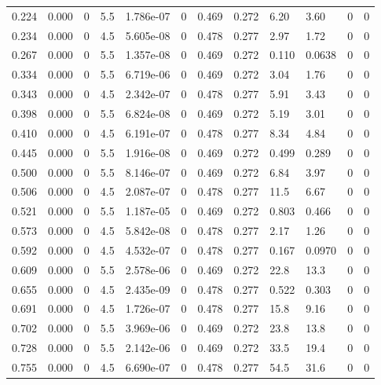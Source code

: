 \documentclass[preview]{standalone}
\begin{document}
{{\begin{tabular}{L{1.2cm}C{1.2cm} C{0.3cm}C{0.5cm} C{1.4cm}C{1.4cm} C{1.4cm}C{1.4cm} C{1.6cm}C{1.6cm} C{1.6cm}C{1.6cm}}
  0.224  &  0.000  & 0     & 5.5 &  1.786e-07  & 0  &  0.469&   0.272& 6.20 & 3.60   &  0 & 0  \\ 
  0.234  &  0.000  & 0     & 4.5 &  5.605e-08  & 0  &  0.478&   0.277& 2.97 & 1.72   &  0 & 0  \\ 
  0.267  &  0.000  & 0     & 5.5 &  1.357e-08  & 0  &  0.469&   0.272& 0.110 & 0.0638   &  0 & 0  \\ 
  0.334  &  0.000  & 0     & 5.5 &  6.719e-06  & 0  &  0.469&   0.272& 3.04 & 1.76   &  0 & 0  \\ 
  0.343  &  0.000  & 0     & 4.5 &  2.342e-07  & 0  &  0.478&   0.277& 5.91 & 3.43   &  0 & 0  \\ 
  0.398  &  0.000  & 0     & 5.5 &  6.824e-08  & 0  &  0.469&   0.272& 5.19 & 3.01   &  0 & 0  \\ 
  0.410  &  0.000  & 0     & 4.5 &  6.191e-07  & 0  &  0.478&   0.277& 8.34 & 4.84   &  0 & 0  \\ 
  0.445  &  0.000  & 0     & 5.5 &  1.916e-08  & 0  &  0.469&   0.272& 0.499 & 0.289   &  0 & 0  \\ 
  0.500  &  0.000  & 0     & 5.5 &  8.146e-07  & 0  &  0.469&   0.272& 6.84 & 3.97   &  0 & 0  \\ 
  0.506  &  0.000  & 0     & 4.5 &  2.087e-07  & 0  &  0.478&   0.277& 11.5 & 6.67   &  0 & 0  \\ 
  0.521  &  0.000  & 0     & 5.5 &  1.187e-05  & 0  &  0.469&   0.272& 0.803 & 0.466   &  0 & 0  \\ 
  0.573  &  0.000  & 0     & 4.5 &  5.842e-08  & 0  &  0.478&   0.277& 2.17 & 1.26   &  0 & 0  \\ 
  0.592  &  0.000  & 0     & 4.5 &  4.532e-07  & 0  &  0.478&   0.277& 0.167 & 0.0970   &  0 & 0  \\ 
  0.609  &  0.000  & 0     & 5.5 &  2.578e-06  & 0  &  0.469&   0.272& 22.8 & 13.3   &  0 & 0  \\ 
  0.655  &  0.000  & 0     & 4.5 &  2.435e-09  & 0  &  0.478&   0.277& 0.522 & 0.303   &  0 & 0  \\ 
  0.691  &  0.000  & 0     & 4.5 &  1.726e-07  & 0  &  0.478&   0.277& 15.8 & 9.16   &  0 & 0  \\ 
  0.702  &  0.000  & 0     & 5.5 &  3.969e-06  & 0  &  0.469&   0.272& 23.8 & 13.8   &  0 & 0  \\ 
  0.728  &  0.000  & 0     & 5.5 &  2.142e-06  & 0  &  0.469&   0.272& 33.5 & 19.4   &  0 & 0  \\ 
  0.755  &  0.000  & 0     & 4.5 &  6.690e-07  & 0  &  0.478&   0.277& 54.5 & 31.6   &  0 & 0  \\ 

\end{tabular}}}
\end{document}

